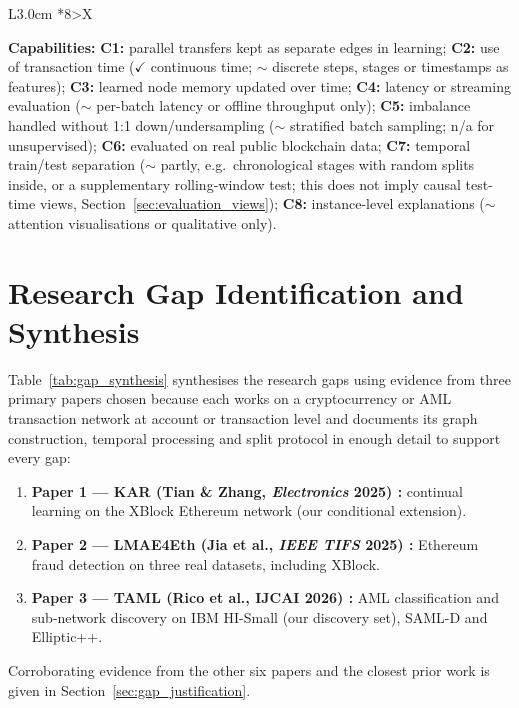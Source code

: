 \documentclass[11pt,a4paper]{article}
\begin{document}
\begin{table}[htbp]
\begin{tabularx}{\textwidth}{L{3.0cm} *{8}{>{\centering\arraybackslash}X}}
\end{tabularx}
\vspace{3pt}
\begin{minipage}{\textwidth}
\scriptsize
\textbf{Capabilities:} \textbf{C1:} parallel transfers kept as separate edges in learning; \textbf{C2:} use of transaction time ($\checkmark$ continuous time; $\sim$ discrete steps, stages or timestamps as features); \textbf{C3:} learned node memory updated over time; \textbf{C4:} latency or streaming evaluation ($\sim$ per-batch latency or offline throughput only); \textbf{C5:} imbalance handled without 1:1 down/undersampling ($\sim$ stratified batch sampling; n/a for unsupervised); \textbf{C6:} evaluated on real public blockchain data; \textbf{C7:} temporal train/test separation ($\sim$ partly, e.g.\ chronological stages with random splits inside, or a supplementary rolling-window test; this does not imply causal test-time views, Section~\ref{sec:evaluation_views}); \textbf{C8:} instance-level explanations ($\sim$ attention visualisations or qualitative only).
\end{minipage}
\end{table}

\section{Research Gap Identification and Synthesis}
\label{sec:research_gaps}

Table~\ref{tab:gap_synthesis} synthesises the research gaps using evidence from three primary papers chosen because each works on a cryptocurrency or AML transaction network at account or transaction level and documents its graph construction, temporal processing and split protocol in enough detail to support every gap:
\begin{enumerate}[leftmargin=*]
    \item \textbf{Paper 1 --- KAR (Tian \& Zhang, \textit{Electronics} 2025) \cite{tian2025kar}:} continual learning on the XBlock Ethereum network (our conditional extension).
    \item \textbf{Paper 2 --- LMAE4Eth (Jia et al., \textit{IEEE TIFS} 2025) \cite{jia2025lmae4eth}:} Ethereum fraud detection on three real datasets, including XBlock.
    \item \textbf{Paper 3 --- TAML (Rico et al., IJCAI 2026) \cite{rico2026taml}:} AML classification and sub-network discovery on IBM HI-Small (our discovery set), SAML-D and Elliptic++.
\end{enumerate}
Corroborating evidence from the other six papers and the closest prior work is given in Section~\ref{sec:gap_justification}.
\end{document}
